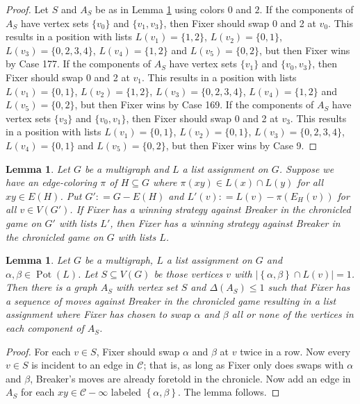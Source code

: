 \documentclass[12pt]{amsart}
\theoremstyle{plain}
\newtheorem{lem}[thm]{Lemma}
\theoremstyle{definition}
\theoremstyle{remark}
\newcommand{\fancy}[1]{\mathcal{#1}}
\newcommand{\C}[1]{\fancy{C}_{#1}}
\newcommand{\set}[1]{\left\{ #1 \right\}}
\newcommand{\card}[1]{\left|#1\right|}
\newcommand{\DefinedAs}{\mathrel{\mathop:}=}
\newcommand{\pot}{\operatorname{Pot}}
\renewcommand{\C}{\fancy{C}}
\begin{document}
\begin{proof}
Let $S$ and $A_S$ be as in Lemma \ref{MultiMoveCombination} using colors $0$ and $2$. If the components of $A_S$ have vertex sets $\{v_0\}$ and $\{v_1, v_3\}$, then Fixer should swap 0 and 2 at $v_0$. This results in a position with lists $L(v_1) = \{1, 2\}$, $L(v_2) = \{0, 1\}$, $L(v_3) = \{0, 2, 3, 4\}$, $L(v_4) = \{1, 2\}$ and $L(v_5) = \{0, 2\}$, but then Fixer wins by Case 177. If the components of $A_S$ have vertex sets $\{v_1\}$ and $\{v_0, v_3\}$, then Fixer should swap 0 and 2 at $v_1$. This results in a position with lists $L(v_1) = \{0, 1\}$, $L(v_2) = \{1, 2\}$, $L(v_3) = \{0, 2, 3, 4\}$, $L(v_4) = \{1, 2\}$ and $L(v_5) = \{0, 2\}$, but then Fixer wins by Case 169. If the components of $A_S$ have vertex sets $\{v_3\}$ and $\{v_0, v_1\}$, then Fixer should swap 0 and 2 at $v_3$. This results in a position with lists $L(v_1) = \{0, 1\}$, $L(v_2) = \{0, 1\}$, $L(v_3) = \{0, 2, 3, 4\}$, $L(v_4) = \{0, 1\}$ and $L(v_5) = \{0, 2\}$, but then Fixer wins by Case 9. 

\end{proof}


\begin{lem}\label{CanColorAndPlayOnRest}
Let $G$ be a multigraph and $L$ a list assignment on $G$.  Suppose we have an edge-coloring $\pi$ of $H \subseteq G$ where $\pi(xy) \in L(x) \cap L(y)$ for all $xy \in E(H)$.  Put $G' \DefinedAs G - E(H)$ and 
$L'(v) \DefinedAs L(v) - \pi(E_H(v))$ for all $v \in V(G')$.  If Fixer has a winning strategy against Breaker in the chronicled game on $G'$ with lists $L'$, then Fixer has a winning strategy against Breaker in the chronicled game on $G$ with lists $L$.
\end{lem}

\begin{lem}\label{MultiMoveCombination}
Let $G$ be a multigraph, $L$ a list assignment on $G$ and $\alpha, \beta \in \pot(L)$. Let $S \subseteq V(G)$ be those vertices $v$ with $\card{\set{\alpha, \beta} \cap L(v)} = 1$.  Then there is a graph $A_S$ with vertex set $S$ and $\Delta(A_S) \le 1$ such that Fixer has a sequence of moves against Breaker in the chronicled game resulting in a list assignment where Fixer has chosen to swap $\alpha$ and $\beta$ all or none of the vertices in each component of $A_S$.
\end{lem}
\begin{proof}
For each $v \in S$, Fixer should swap $\alpha$ and $\beta$ at $v$ twice in a row.  Now every $v \in S$ is incident to an edge in $\C$; that is, as long as Fixer only does swaps with $\alpha$ and $\beta$, Breaker's moves are already foretold in the chronicle.  Now add an edge in $A_S$ for each $xy \in \C - \infty$ labeled $\set{\alpha, \beta}$. The lemma follows.
\end{proof}
\end{document}
